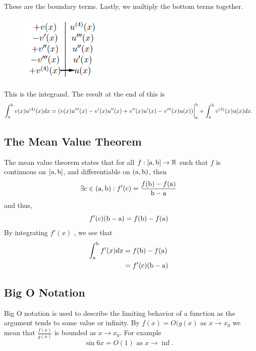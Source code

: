     These are the boundary terms. Lastly, we multiply the bottom terms together. 
    \begin{figure}[H]
        \centering
        \includegraphics{include/tabular-integrand.png}
    \end{figure}
    This is the integrand. The result at the end of this is 
    \begin{equation}
        \int_\mathrm{a}^\mathrm{b} v(x)u^{(4)}(x) dx = (v(x)u'''(x) - v'(x)u''(x) + v''(x)u'(x)-v'''(x)u(x))\biggr\rvert_\mathrm{a}^\mathrm{b} + \int_\mathrm{a}^\mathrm{b} v^{(4)}(x)u(x) dx.
    \end{equation}
\subsection{The Mean Value Theorem}
    The mean value theorem states that for all \(f:[\mathrm{a},\mathrm{b}]\to \mathbb{R}\) such that \(f\) is continuous on \([\mathrm{a},\mathrm{b}]\), and differentiable on \((\mathrm{a}, \mathrm{b})\), then 
    \begin{equation}
        \exists c \in (\mathrm{a}, \mathrm{b}) : f'(\text{c}) = \frac{f(\mathrm{b})-f(\mathrm{a})}{\mathrm{b}-\mathrm{a}}
    \end{equation}
    and thus,
    \begin{equation}
        f'(c)(\mathrm{b}-\mathrm{a}) = f(\mathrm{b})-f(\mathrm{a})
    \end{equation}
    By integrating \(f'(x)\) , we see that
    \begin{equation}
        \begin{split}
            \int_{\mathrm{a}}^{\mathrm{b}} f'(x) dx &= f(\mathrm{b})-f(\mathrm{a})\\
            &=f'(\text{c})(\mathrm{b}-\mathrm{a})
        \end{split}
    \end{equation}
\subsection{Big O Notation}
Big O notation is used to describe the limiting behavior of a function as the argument tends to some value or infinity. By \(f(x)=O(g(x)\) as \(x\to x_0\) we mean that \(\frac{f(x)}{g(x)}\) is bounded as \(x\to x_0\). For example 
\begin{equation}
    \sin 6x = O(1) \text{ as } x\to \inf.
\end{equation}